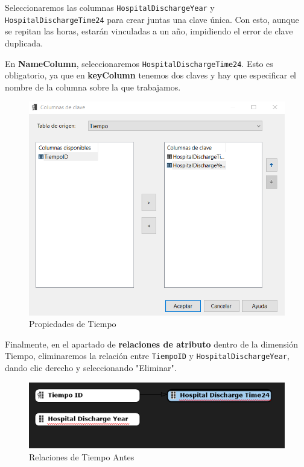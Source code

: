\documentclass[12pt, a4paper, twoside]{article}
\begin{document}
Seleccionaremos las columnas \texttt{HospitalDischargeYear} y \texttt{HospitalDischargeTime24} para crear juntas una clave única. Con esto, aunque se repitan las horas, estarán vinculadas a un año, impidiendo el error de clave duplicada.

En \textbf{NameColumn}, seleccionaremos \texttt{HospitalDischargeTime24}. Esto es obligatorio, ya que en \textbf{keyColumn} tenemos dos claves y hay que especificar el nombre de la columna sobre la que trabajamos.

\begin{figure}[H]
	\centering
	\includegraphics[width=1\textwidth]{image/keyColumnTiempo}
	\caption{Propiedades de Tiempo}
	\label{fig:29}
\end{figure}

Finalmente, en el apartado de \textbf{relaciones de atributo} dentro de la dimensión Tiempo, eliminaremos la relación entre \texttt{TiempoID} y \texttt{HospitalDischargeYear}, dando clic derecho y seleccionando "Eliminar".

\begin{figure}[H]
	\centering
	\includegraphics[width=1\textwidth]{image/relacionesTiempoDps1}
	\caption{Relaciones de Tiempo Antes}
	\label{fig:26}
\end{figure}
\end{document}
